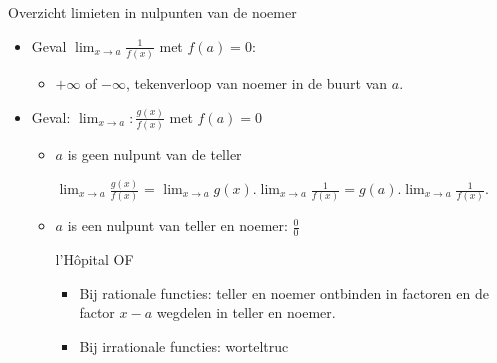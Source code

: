 \documentclass[handout]{beamer}
\newcommand{\ds}{\displaystyle}
\begin{document}
\begin{frame}{Overzicht limieten in nulpunten van de noemer}
\begin{itemize}
	\item Geval $\displaystyle{\lim_{x \rightarrow a}} \frac{1}{f(x)}$
met $f(a) = 0$: 
\begin{itemize}
	\item[] $+ \infty$ of $- \infty$, tekenverloop van noemer in de buurt van $a$. 
\end{itemize}
\item Geval: $\displaystyle{\lim_{x \rightarrow a}}:
\frac{g(x)}{f(x)}$ met $f(a) = 0$
\begin{itemize}
	\item $a$ is geen nulpunt van de teller
	
	$\displaystyle{\lim_{x \rightarrow a}}
\frac{g(x)}{f(x)}$ = $\displaystyle{\lim_{x \rightarrow a}} g(x) .
\displaystyle{\lim_{x \rightarrow a}} \frac{1}{f(x)} = g(a) .
\displaystyle{\lim_{x \rightarrow a}} \frac{1}{f(x)}$.
\item $a$ is een nulpunt van teller en noemer: $\ds \frac00$

	 l'H\^{o}pital
	 OF 
	
	\begin{itemize}
		\item Bij rationale functies: teller en noemer
ontbinden in factoren en de factor $x-a$ wegdelen in teller en
noemer.
\item Bij irrationale functies: worteltruc
	
\end{itemize}
	
\end{itemize}
\end{itemize}

\end{frame}
\end{document}
